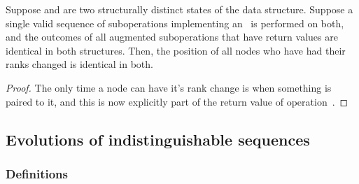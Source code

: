 \begin{lemma} 
Suppose  and  are two structurally distinct states of the data structure. Suppose a single valid sequence of suboperations implementing an \opEm\ is performed on both, and the outcomes of all augmented suboperations that have return values are identical in both structures. Then, the position of all nodes who have had their ranks changed is identical in both.
\end{lemma}

\begin{fullonly}
\begin{proof}
The only time a node can have it's rank change is when something is paired to it, and this is now explicitly part of the return value of operation~.
\end{proof}
\end{fullonly}



\subsection{Evolutions of indistinguishable sequences} 

\subsubsection{Definitions} 

